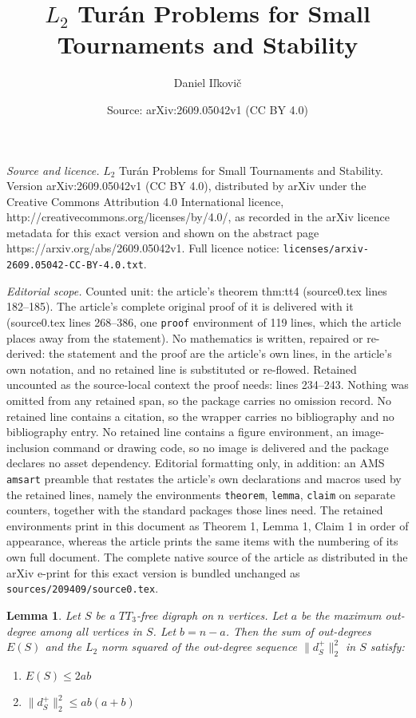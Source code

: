 \documentclass[10pt,a4paper]{amsart}
\title{$L_2$ Tur\'an Problems for Small Tournaments and Stability}
\author{Daniel I\v{l}kovi\v{c}}
\date{Source: arXiv:2609.05042v1 (CC BY 4.0)}
\newtheorem{lemma}{Lemma}
\begin{document}
\maketitle

\noindent\emph{Source and licence.} $L_2$ Tur\'an Problems for Small Tournaments and Stability. Version arXiv:2609.05042v1 (CC BY 4.0), distributed by arXiv under the Creative Commons Attribution 4.0 International licence, http://creativecommons.org/licenses/by/4.0/, as recorded in the arXiv licence metadata for this exact version and shown on the abstract page https://arxiv.org/abs/2609.05042v1. Full licence notice: \texttt{licenses/arxiv-2609.05042-CC-BY-4.0.txt}.\par\smallskip

\noindent\textit{Editorial scope.} Counted unit: the article's theorem thm:tt4 (source0.tex lines 182--185). The article's complete original proof of it is delivered with it (source0.tex lines 268--386, one \texttt{proof} environment of 119 lines, which the article places away from the statement). No mathematics is written, repaired or re-derived: the statement and the proof are the article's own lines, in the article's own notation, and no retained line is substituted or re-flowed.  Retained uncounted as the source-local context the proof needs: lines 234--243.  Nothing was omitted from any retained span, so the package carries no omission record.  No retained line contains a citation, so the wrapper carries no bibliography and no bibliography entry.  No retained line contains a figure environment, an image-inclusion command or drawing code, so no image is delivered and the package declares no asset dependency.  Editorial formatting only, in addition: an AMS \texttt{amsart} preamble that restates the article's own declarations and macros used by the retained lines, namely the environments \texttt{theorem}, \texttt{lemma}, \texttt{claim} on separate counters, together with the standard packages those lines need.  The retained environments print in this document as Theorem 1, Lemma 1, Claim 1 in order of appearance, whereas the article prints the same items with the numbering of its own full document.  The complete native source of the article as distributed in the arXiv e-print for this exact version is bundled unchanged as \texttt{sources/209409/source0.tex}.
\begin{lemma} \label{lem:tt3_free}
Let $S$ be a $TT_3$-free digraph on $n$ vertices.
Let $a$ be the maximum out-degree among all vertices in $S$.
Let $b = n - a$.
Then the sum of out-degrees $E(S)$ and the $L_2$ norm squared of the out-degree sequence $\|d^+_S\|_2^2$ in $S$ satisfy:
\begin{enumerate}
\item $E(S) \le 2ab$
\item $\|d^+_S\|_2^2 \le ab(a+b)$
\end{enumerate}
\end{lemma}
\end{document}

